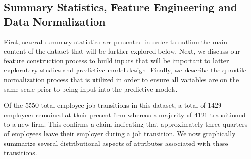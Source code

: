\documentclass[10pt]{article}
\begin{document}
\subsection{Summary Statistics, Feature Engineering and Data Normalization}

First, several summary statistics are presented in order to outline 
the main content of the dataset that will be further explored below.
Next, we discuss our feature construction process to build inputs 
that will be important to latter exploratory studies and predictive 
model design.  Finally, we describe the quantile normalization process 
that is utilized in order to ensure all variables are on the same scale prior 
to being input into the predictive models.

Of the 5550 total employee job transitions in this dataset, 
a total of 1429 employees remained at their present firm whereas a majority of 4121 
transitioned to a new firm.  This confirms a claim \cite{Smart2016} indicating 
that approximately three quarters of employees leave their employer during a job 
transition.  We now graphically summarize several distributional aspects of 
attributes associated with these transitions.
\end{document}
